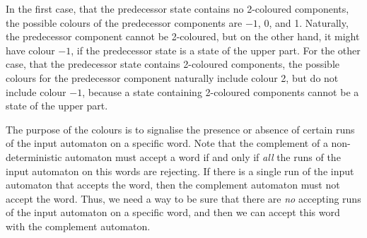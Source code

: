 In the first case, that the predecessor state contains no 2-coloured components, the possible colours of the predecessor components are $-1$, 0, and 1. Naturally, the predecessor component cannot be 2-coloured, but on the other hand, it might have colour $-1$, if the predecessor state is a state of the upper part. For the other case, that the predecessor state contains 2-coloured components, the possible colours for the predecessor component naturally include colour 2, but do not include colour $-1$, because a state containing 2-coloured components cannot be a state of the upper part.

The purpose of the colours is to signalise the presence or absence of certain runs of the input automaton on a specific word. Note that the complement of a non-deterministic automaton must accept a word if and only if \textit{all} the runs of the input automaton on this words are rejecting. If there is a single run of the input automaton that accepts the word, then the complement automaton must not accept the word. Thus, we need a way to be sure that there are \textit{no} accepting runs of the input automaton on a specific word, and then we can accept this word with the complement automaton. 

